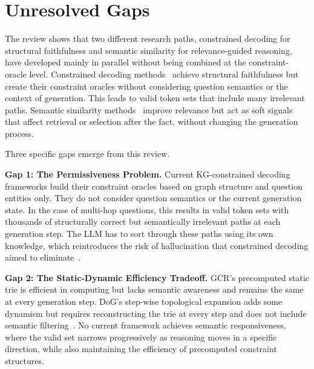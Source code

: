 \section{Unresolved Gaps}
\label{sec:synthesis}

The review shows that two different research paths, constrained decoding for structural faithfulness and semantic similarity for relevance-guided reasoning, have developed mainly in parallel without being combined at the constraint-oracle level. Constrained decoding methods~\citep{luo2025-graph-constrained-reasoning, li2024-decoding-on-graphs} achieve structural faithfulness but create their constraint oracles without considering question semantics or the context of generation. This leads to valid token sets that include many irrelevant paths. Semantic similarity methods~\citep{shi2021kgpath, saxena2022kgqa, yuan2026routerkgqa} improve relevance but act as soft signals that affect retrieval or selection after the fact, without changing the generation process.

Three specific gaps emerge from this review.

\textbf{Gap 1: The Permissiveness Problem.} Current KG-constrained decoding frameworks build their constraint oracles based on graph structure and question entities only. They do not consider question semantics or the current generation state. In the case of multi-hop questions, this results in valid token sets with thousands of structurally correct but semantically irrelevant paths at each generation step. The LLM has to sort through these paths using its own knowledge, which reintroduces the risk of hallucination that constrained decoding aimed to eliminate~\citep{luo2025-graph-constrained-reasoning, li2024-decoding-on-graphs}.

\textbf{Gap 2: The Static-Dynamic Efficiency Tradeoff.} GCR's precomputed static trie is efficient in computing but lacks semantic awareness and remains the same at every generation step. DoG's step-wise topological expansion adds some dynamism but requires reconstructing the trie at every step and does not include semantic filtering~\citep{li2024-decoding-on-graphs, willard2023outlines}. No current framework achieves semantic responsiveness, where the valid set narrows progressively as reasoning moves in a specific direction, while also maintaining the efficiency of precomputed constraint structures.

